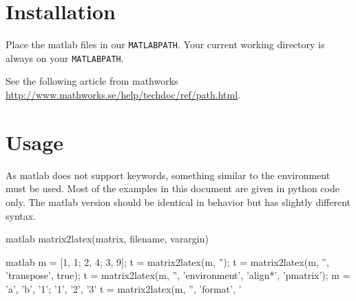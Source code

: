 \section{Installation}
Place the matlab files in our \verb!MATLABPATH!.
Your current working directory is always on your \verb!MATLABPATH!.

See the following article from mathworks
\url{http://www.mathworks.se/help/techdoc/ref/path.html}.

\section{Usage}
As matlab does not support keywords, something similar to the environment must be used.
Most of the examples in this document are given in python code only. The matlab version should be identical
in behavior but has slightly different syntax.

\begin{pygments}{matlab}
matrix2latex(matrix, filename, varargin)  
\end{pygments}

\begin{pygments}{matlab}
m = [1, 1; 2, 4; 3, 9];
t = matrix2latex(m, '');
t = matrix2latex(m, '', 'transpose', true);
t = matrix2latex(m, '', 'environment', {'align*', 'pmatrix'});
m = {'a', 'b', '1'; '1', '2', '3'}
t = matrix2latex(m, '', 'format', '%
\end{pygments}